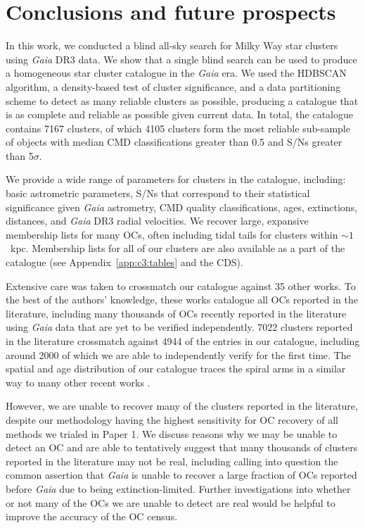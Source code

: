 \section{Conclusions and future prospects}\label{c3:sec:conclusion}  %

In this work, we conducted a blind all-sky search for Milky Way star clusters using \emph{Gaia} DR3 data. We show that a single blind search can be used to produce a homogeneous star cluster catalogue in the \emph{Gaia} era. We used the HDBSCAN algorithm, a density-based test of cluster significance, and a data partitioning scheme to detect as many reliable clusters as possible, producing a catalogue that is as complete and reliable as possible given current data. In total, the catalogue contains 7167 clusters, of which 4105 clusters form the most reliable sub-sample of objects with median CMD classifications greater than 0.5 and S/Ns greater than 5$\sigma$.

We provide a wide range of parameters for clusters in the catalogue, including: basic astrometric parameters, S/Ns that correspond to their statistical significance given \emph{Gaia} astrometry, CMD quality classifications, ages, extinctions, distances, and \emph{Gaia} DR3 radial velocities. We recover large, expansive membership lists for many OCs, often including tidal tails for clusters within $\sim 1$~kpc. Membership lists for all of our clusters are also available as a part of the catalogue (see Appendix~\ref{app:c3:tables} and the CDS).

Extensive care was taken to crossmatch our catalogue against 35 other works. To the best of the authors' knowledge, these works catalogue all OCs reported in the literature, including many thousands of OCs recently reported in the literature using \emph{Gaia} data that are yet to be verified independently. 7022 clusters reported in the literature crossmatch against 4944 of the entries in our catalogue, including around 2000 of which we are able to independently verify for the first time. The spatial and age distribution of our catalogue traces the spiral arms in a similar way to many other recent works \citep[e.g.][]{cantat-gaudin_painting_2020, castro-ginard_milky_2021}.

However, we are unable to recover many of the clusters reported in the literature, despite our methodology having the highest sensitivity for OC recovery of all methods we trialed in Paper 1. We discuss reasons why we may be unable to detect an OC and are able to tentatively suggest that many thousands of clusters reported in the literature may not be real, including calling into question the common assertion that \emph{Gaia} is unable to recover a large fraction of OCs reported before \emph{Gaia} due to being extinction-limited. Further investigations into whether or not many of the OCs we are unable to detect are real would be helpful to improve the accuracy of the OC census.


